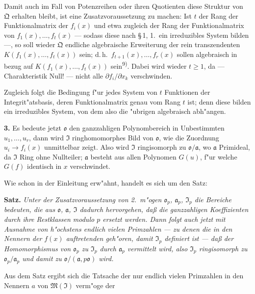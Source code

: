 Damit auch im Fall von Potenzreihen oder ihren Quotienten diese Struktur von $\mathfrak{Q}$ erhalten bleibt, ist eine Zusatzvoraussetzung zu machen: Ist $t$ der Rang der Funktionalmatrix der $f_i(x)$ und etwa zugleich der Rang der Funktionalmatrix von $f_1(x),\ldots,f_t(x)$ --- sodass diese nach \S\,1, 1.\ ein irreduzibles System bilden ---, so soll wieder $\mathfrak{Q}$ endliche algebraische Erweiterung der rein transzendenten $K(f_1(x),\ldots,f_t(x))$ sein; d.\,h.\ $f_{t+1}(x),\ldots,f_r(x)$ sollen algebraisch in bezug auf $K(f_1(x),\ldots,f_t(x))$ sein\textsuperscript{9)}. Dabei wird wieder $t \geq 1$, da --- Charakteristik Null! --- nicht alle $\partial f_i/\partial x_k$ verschwinden.

Zugleich folgt die Bedingung f"ur jedes System von $t$ Funktionen der Integrit"atsbasis, deren Funktionalmatrix genau vom Rang $t$ ist; denn diese bilden ein irreduzibles System, von dem also die "ubrigen algebraisch abh"angen.

\medskip\noindent\textbf{3.}
Es bedeute jetzt $\mathfrak{o}$ den ganzzahligen Polynombereich in Unbestimmten $u_1,\ldots,u_r$, dann wird $\mathfrak{I}$ ringhomomorphes Bild von $\mathfrak{o}$, wie die Zuordnung $u_i \to f_i(x)$ unmittelbar zeigt. Also wird $\mathfrak{I}$ ringisomorph zu $\mathfrak{o}/\mathfrak{a}$, wo $\mathfrak{a}$ Primideal, da $\mathfrak{I}$ Ring ohne Nullteiler; $\mathfrak{a}$ besteht aus allen Polynomen $G(u)$, f"ur welche $G(f)$ identisch in $x$ verschwindet.

Wie schon in der Einleitung erw"ahnt, handelt es sich um den Satz:

\medskip\noindent\textbf{Satz.}
\textit{Unter der Zusatzvoraussetzung von 2.\ m"ogen $\mathfrak{o}_p$, $\mathfrak{a}_p$, $\mathfrak{I}_p$ die Bereiche bedeuten, die aus $\mathfrak{o}$, $\mathfrak{a}$, $\mathfrak{I}$ dadurch hervorgehen, da\ss{} die ganzzahligen Koeffizienten durch ihre Restklassen modulo $p$ ersetzt werden. Dann folgt auch jetzt mit Ausnahme von h"ochstens endlich vielen Primzahlen --- zu denen die in den Nennern der $f(x)$ auftretenden geh"oren, damit $\mathfrak{I}_p$ definiert ist --- da\ss{} der Homomorphismus von $\mathfrak{o}_p$ zu $\mathfrak{I}_p$ durch $\mathfrak{a}_p$ vermittelt wird, also $\mathfrak{I}_p$ ringisomorph zu $\mathfrak{o}_p/\mathfrak{a}_p$ und damit zu $\mathfrak{o}/(\mathfrak{a}, p\mathfrak{o})$ wird.}

Aus dem Satz ergibt sich die Tatsache der nur endlich vielen Primzahlen in den Nennern $a$ von $\mathfrak{M}(\mathfrak{I})$ verm"oge der

